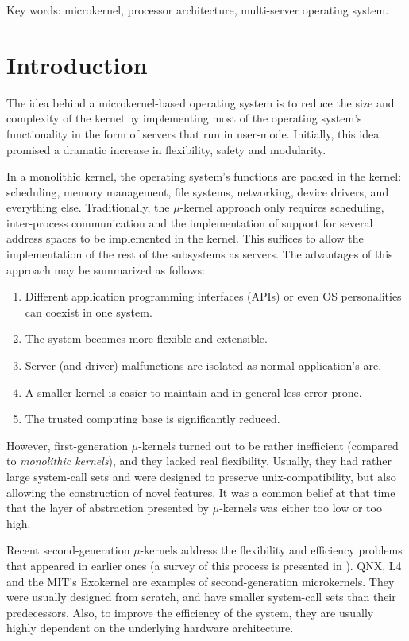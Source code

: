 \documentclass[12pt, letterpaper, oneside, english]{article}
\begin{document}
\begin{small}
Key words: microkernel, processor architecture, multi-server operating system. \\
\end{small}

\section{Introduction}

The idea behind a microkernel-based operating system is to reduce the size and complexity of the kernel by implementing most of the operating system's functionality in the form of servers that run in user-mode. Initially, this idea promised a dramatic increase in flexibility, safety and modularity. 

In a monolithic kernel, the operating system's functions are packed in the kernel: scheduling, memory management, file systems, networking, device drivers, and everything else. Traditionally, the $\mu$-kernel approach only requires scheduling, inter-process communication and the implementation of support for several address spaces to be implemented in the kernel. This suffices to allow the implementation of the rest of the subsystems as servers. The advantages of this approach may be summarized as follows:
\begin{enumerate}
\item Different application programming interfaces (APIs) or even OS personalities can coexist in one system.
\item The system becomes more flexible and extensible.
\item Server (and driver) malfunctions are isolated as normal application's are.
\item A smaller kernel is easier to maintain and in general less error-prone.
\item The trusted computing base is significantly reduced.
\end{enumerate}

However, first-generation $\mu$-kernels turned out to be rather inefficient (compared to \emph{monolithic kernels}), and they lacked real flexibility. Usually, they had rather large system-call sets and were designed to preserve unix-compatibility, but also allowing the construction of novel features. It was a common belief at that time that the layer of abstraction presented by $\mu$-kernels was either too low or too high.

Recent second-generation $\mu$-kernels address the flexibility and efficiency problems that appeared in earlier ones (a survey of this process is presented in \cite{Lied}). QNX, L4 and the MIT's Exokernel are examples of second-generation microkernels. They were usually designed from scratch, and have smaller system-call sets than their predecessors. Also, to improve the efficiency of the system, they are usually highly dependent on the underlying hardware architecture.
\end{document}
